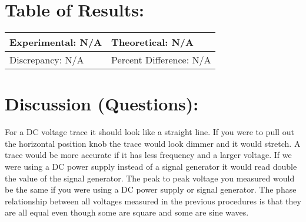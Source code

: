 \documentclass{article}
\begin{document}
\section*{Table of Results:}
\begin{center}
\begin{tabular}{|l|l|}
\hline
	Experimental: N/A & Theoretical: N/A  \\ \hline
	Discrepancy: N/A   & Percent Difference: N/A \\
\hline
\end{tabular}
\end{center}

\section*{Discussion (Questions):}
\doublespace
For a DC voltage trace it should look like a straight line.  If you were to pull out the horizontal position knob the trace would look dimmer and it would stretch.  A trace would be more accurate if it has less frequency and a larger voltage.  If we were using a DC power supply instead of a signal generator it would read double the value of the signal generator.  The peak to peak voltage you measured would be the same if you were using a DC power supply or signal generator.  The phase relationship between all voltages measured in the previous procedures is that they are all equal even though some are square and some are sine waves.  

  
  
\end{document}
